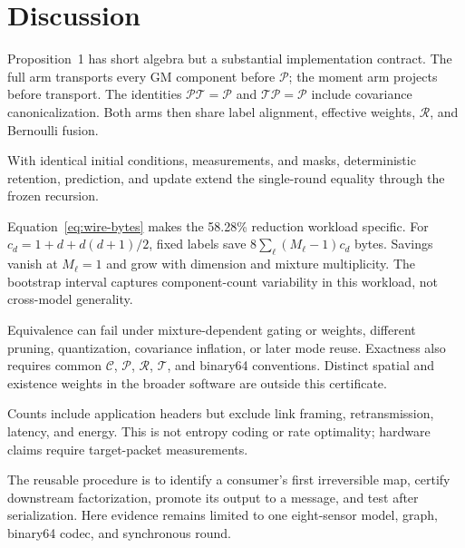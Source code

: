 \section{Discussion}
\label{sec:discussion}

Proposition~1 has short algebra but a substantial implementation contract. The
full arm transports every GM component before $\mathcal P$; the moment arm
projects before transport. The identities
$\mathcal P\mathcal T=\mathcal P$ and
$\mathcal T\mathcal P=\mathcal P$ include covariance canonicalization. Both
arms then share label alignment, effective weights, $\mathcal R$, and Bernoulli
fusion.

With identical initial conditions, measurements, and masks, deterministic
retention, prediction, and update extend the single-round equality through the
frozen recursion.

Equation~\eqref{eq:wire-bytes} makes the 58.28\% reduction workload specific.
For $c_d=1+d+d(d+1)/2$, fixed labels save
$8\sum_\ell(M_\ell-1)c_d$ bytes. Savings vanish at $M_\ell=1$ and grow with
dimension and mixture multiplicity. The bootstrap interval captures
component-count variability in this workload, not cross-model generality.

Equivalence can fail under mixture-dependent gating or weights, different
pruning, quantization, covariance inflation, or later mode reuse. Exactness also
requires common $\mathcal C$, $\mathcal P$, $\mathcal R$, $\mathcal T$, and
binary64 conventions. Distinct spatial and existence weights in the broader
software are outside this certificate.

Counts include application headers but exclude link framing, retransmission,
latency, and energy. This is not entropy coding or rate optimality; hardware
claims require target-packet measurements.

The reusable procedure is to identify a consumer's first irreversible map,
certify downstream factorization, promote its output to a message, and test
after serialization. Here evidence remains limited to one eight-sensor model,
graph, binary64 codec, and synchronous round.
